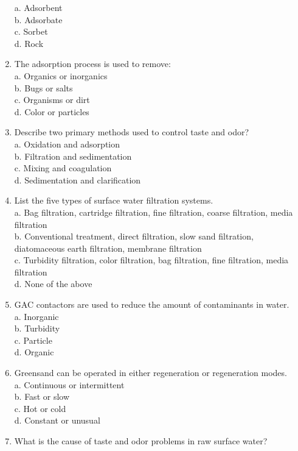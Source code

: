 \begin{enumerate}
a. Adsorbent\\
b. Adsorbate\\
c. Sorbet\\
d. Rock\\
\item The adsorption process is used to remove:\\
a. Organics or inorganics\\
b. Bugs or salts\\
c. Organisms or dirt\\
d. Color or particles\\
\item Describe two primary methods used to control taste and odor?\\
a. Oxidation and adsorption\\
b. Filtration and sedimentation\\
c. Mixing and coagulation\\
d. Sedimentation and clarification\\
\item List the five types of surface water filtration systems.\\
a. Bag filtration, cartridge filtration, fine filtration, coarse filtration, media filtration\\
b. Conventional treatment, direct filtration, slow sand filtration, diatomaceous earth filtration, membrane filtration\\
c. Turbidity filtration, color filtration, bag filtration, fine filtration, media filtration\\
d. None of the above\\
\item GAC contactors are used to reduce the amount of contaminants in water.\\
a. Inorganic\\
b. Turbidity\\
c. Particle\\
d. Organic\\
\item Greensand can be operated in either regeneration or regeneration modes.\\
a. Continuous or intermittent\\
b. Fast or slow\\
c. Hot or cold\\
d. Constant or unusual\\
\item What is the cause of taste and odor problems in raw surface water?\\

\end{enumerate}
